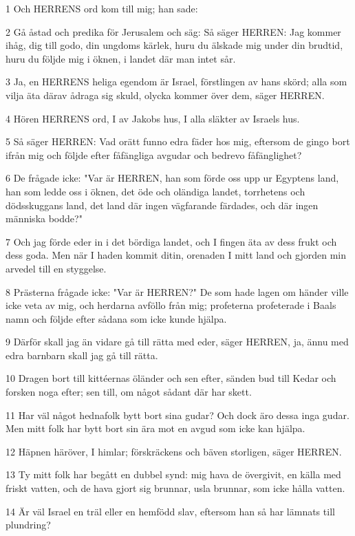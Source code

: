 \par 1 Och HERRENS ord kom till mig; han sade:
\par 2 Gå åstad och predika för Jerusalem och säg: Så säger HERREN: Jag kommer ihåg, dig till godo, din ungdoms kärlek, huru du älskade mig under din brudtid, huru du följde mig i öknen, i landet där man intet sår.
\par 3 Ja, en HERRENS heliga egendom är Israel, förstlingen av hans skörd; alla som vilja äta därav ådraga sig skuld, olycka kommer över dem, säger HERREN.
\par 4 Hören HERRENS ord, I av Jakobs hus, I alla släkter av Israels hus.
\par 5 Så säger HERREN: Vad orätt funno edra fäder hos mig, eftersom de gingo bort ifrån mig och följde efter fåfängliga avgudar och bedrevo fåfänglighet?
\par 6 De frågade icke: "Var är HERREN, han som förde oss upp ur Egyptens land, han som ledde oss i öknen, det öde och oländiga landet, torrhetens och dödsskuggans land, det land där ingen vägfarande färdades, och där ingen människa bodde?"
\par 7 Och jag förde eder in i det bördiga landet, och I fingen äta av dess frukt och dess goda. Men när I haden kommit ditin, orenaden I mitt land och gjorden min arvedel till en styggelse.
\par 8 Prästerna frågade icke: "Var är HERREN?" De som hade lagen om händer ville icke veta av mig, och herdarna avföllo från mig; profeterna profeterade i Baals namn och följde efter sådana som icke kunde hjälpa.
\par 9 Därför skall jag än vidare gå till rätta med eder, säger HERREN, ja, ännu med edra barnbarn skall jag gå till rätta.
\par 10 Dragen bort till kittéernas öländer och sen efter, sänden bud till Kedar och forsken noga efter; sen till, om något sådant där har skett.
\par 11 Har väl något hednafolk bytt bort sina gudar? Och dock äro dessa inga gudar. Men mitt folk har bytt bort sin ära mot en avgud som icke kan hjälpa.
\par 12 Häpnen häröver, I himlar; förskräckens och bäven storligen, säger HERREN.
\par 13 Ty mitt folk har begått en dubbel synd: mig hava de övergivit, en källa med friskt vatten, och de hava gjort sig brunnar, usla brunnar, som icke hålla vatten.
\par 14 Är väl Israel en träl eller en hemfödd slav, eftersom han så har lämnats till plundring?
